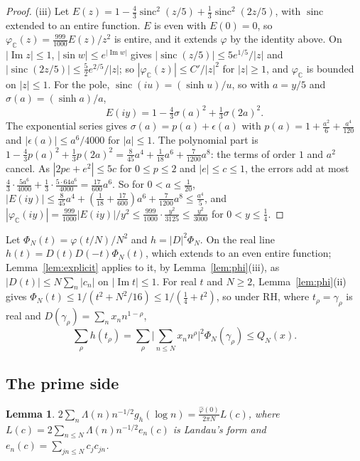 \documentclass[11pt]{article}
\newtheorem{lemma}[theorem]{Lemma}
\theoremstyle{definition}
\newcommand{\sinc}{\operatorname{sinc}}
\begin{document}
\begin{proof}
(iii) Let $E(z) = 1 - \frac43 \sinc^2(z/5) + \frac13 \sinc^2(2z/5)$, with $\sinc$ extended to an entire function. $E$
is even with $E(0) = 0$, so $\varphi_{\mathbb C}(z) = \frac{999}{1000} E(z)/z^2$ is entire, and it extends $\varphi$ by
the identity above. On $|\operatorname{Im} z| \le 1$, $|\sin w| \le e^{|\operatorname{Im} w|}$ gives $|\sinc(z/5)| \le
5e^{1/5}/|z|$ and $|\sinc(2z/5)| \le \frac52 e^{2/5}/|z|$; so $|\varphi_{\mathbb C}(z)| \le C'/|z|^2$ for $|z| \ge 1$,
and $\varphi_{\mathbb C}$ is bounded on $|z| \le 1$. For the pole, $\sinc(iu) = (\sinh u)/u$, so with $a = y/5$ and
$\sigma(a) = (\sinh a)/a$,
\[
E(iy) = 1 - \tfrac43 \sigma(a)^2 + \tfrac13 \sigma(2a)^2 .
\]
The exponential series gives $\sigma(a) = p(a) + \epsilon(a)$ with $p(a) = 1 + \frac{a^2}6 + \frac{a^4}{120}$ and
$|\epsilon(a)| \le a^6/4000$ for $|a| \le 1$. The polynomial part is $1 - \frac43 p(a)^2 + \frac13 p(2a)^2 =
\frac{8}{45}a^4 + \frac{1}{18}a^6 + \frac{7}{1200}a^8$: the terms of order $1$ and $a^2$ cancel. As $|2pe + e^2| \le 5c$
for $0 \le p \le 2$ and $|e| \le c \le 1$, the errors add at most $\frac43 \cdot \frac{5a^6}{4000} + \frac13 \cdot
\frac{5 \cdot 64a^6}{4000} = \frac{17}{600}a^6$. So for $0 < a \le \frac{1}{20}$, $|E(iy)| \le \frac{8}{45}a^4 +
(\frac{1}{18} + \frac{17}{600})a^6 + \frac{7}{1200}a^8 \le \frac{a^4}{5}$, and $|\varphi_{\mathbb C}(iy)| =
\frac{999}{1000}|E(iy)|/y^2 \le \frac{999}{1000} \cdot \frac{y^2}{3125} \le \frac{y^2}{3000}$ for $0 < y \le \frac14$.
\end{proof}

Let $\Phi_N(t) = \varphi(t/N)/N^2$ and $h = |D|^2 \Phi_N$. On the real line $h(t) = D(t) D(-t) \Phi_N(t)$, which
extends to an even entire function; Lemma~\ref{lem:explicit} applies to it, by Lemma~\ref{lem:phi}(iii), as $|D(t)| \le
N \sum_n
|c_n|$ on $|\operatorname{Im} t| \le 1$. For real $t$ and $N \ge 2$, Lemma~\ref{lem:phi}(ii) gives $\Phi_N(t) \le
1/(t^2 + N^2/16)
\le 1/(\frac14 + t^2)$, so under RH, where $t_\rho = \gamma_\rho$ is real and $D(\gamma_\rho) = \sum_n x_n
n^{1 - \rho}$,
\begin{equation}\label{eq:zero-side}
\sum_\rho h(t_\rho) = \sum_\rho \Big|\sum_{n \le N} x_n n^\rho\Big|^2 \Phi_N(\gamma_\rho) \le Q_N(x).
\end{equation}

\subsection{The prime side}

\begin{lemma}\label{lem:prime}
$2 \sum_n \Lambda(n) n^{-1/2} g_h(\log n) = \frac{\hat\varphi(0)}{2\pi N} L(c)$, where $L(c) = 2 \sum_{n \le N}
\Lambda(n) n^{-1/2} e_n(c)$ is Landau's form and $e_n(c) = \sum_{jn \le N} c_j c_{jn}$.
\end{lemma}
\end{document}

